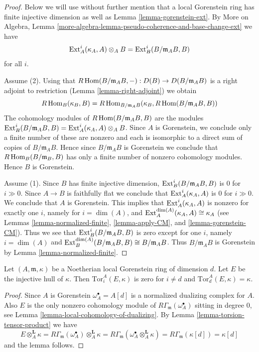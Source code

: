 \begin{proof}
Below we will use without further mention that a local Gorenstein ring
has finite injective dimension as well as Lemma \ref{lemma-gorenstein-ext}.
By More on Algebra, Lemma
\ref{more-algebra-lemma-pseudo-coherence-and-base-change-ext}
we have
$$
\mathop{\mathrm{Ext}}\nolimits^i_A(\kappa_A, A) \otimes_A B =
\mathop{\mathrm{Ext}}\nolimits^i_B(B/\mathfrak m_A B, B)
$$
for all $i$.

\medskip\noindent
Assume (2). Using that
$R\mathop{\mathrm{Hom}}\nolimits(B/\mathfrak m_A B, -) : D(B) \to D(B/\mathfrak m_A B)$ is a
right adjoint to restriction (Lemma \ref{lemma-right-adjoint}) we obtain
$$
R\mathop{\mathrm{Hom}}\nolimits_B(\kappa_B, B) =
R\mathop{\mathrm{Hom}}\nolimits_{B/\mathfrak m_A B}(\kappa_B, R\mathop{\mathrm{Hom}}\nolimits(B/\mathfrak m_A B, B))
$$
The cohomology modules of $R\mathop{\mathrm{Hom}}\nolimits(B/\mathfrak m_A B, B)$ are the modules
$\mathop{\mathrm{Ext}}\nolimits^i_B(B/\mathfrak m_A B, B) =
\mathop{\mathrm{Ext}}\nolimits^i_A(\kappa_A, A) \otimes_A B$.
Since $A$ is Gorenstein, we conclude only a finite number of these are nonzero
and each is isomorphic to a direct sum of copies of $B/\mathfrak m_A B$.
Hence since $B/\mathfrak m_A B$ is Gorenstein we conclude that
$R\mathop{\mathrm{Hom}}\nolimits_B(B/\mathfrak m_B, B)$ has only a finite number of nonzero
cohomology modules. Hence $B$ is Gorenstein.

\medskip\noindent
Assume (1). Since $B$ has finite injective dimension,
$\mathop{\mathrm{Ext}}\nolimits^i_B(B/\mathfrak m_A B, B)$ is $0$ for $i \gg 0$.
Since $A \to B$ is faithfully flat
we conclude that $\mathop{\mathrm{Ext}}\nolimits^i_A(\kappa_A, A)$ is $0$
for $i \gg 0$. We conclude that $A$ is Gorenstein. This implies that
$\mathop{\mathrm{Ext}}\nolimits^i_A(\kappa_A, A)$ is nonzero for exactly one $i$,
namely for $i = \dim(A)$, and
$\mathop{\mathrm{Ext}}\nolimits^{\dim(A)}_A(\kappa_A, A) \cong \kappa_A$
(see Lemmas \ref{lemma-normalized-finite}, \ref{lemma-apply-CM}, and
\ref{lemma-gorenstein-CM}).
Thus we see that
$\mathop{\mathrm{Ext}}\nolimits^i_B(B/\mathfrak m_A B, B)$ is zero except for one $i$,
namely $i = \dim(A)$ and
$\mathop{\mathrm{Ext}}\nolimits^{\dim(A)}_B(B/\mathfrak m_A B, B) \cong B/\mathfrak m_A B$.
Thus $B/\mathfrak m_A B$ is Gorenstein by
Lemma \ref{lemma-normalized-finite}.
\end{proof}

\begin{lemma}
\label{lemma-tor-injective-hull}
Let $(A, \mathfrak m, \kappa)$ be a Noetherian local Gorenstein ring
of dimension $d$. Let $E$ be the injective hull of $\kappa$. Then
$\text{Tor}_i^A(E, \kappa)$ is zero for $i \not = d$
and $\text{Tor}_d^A(E, \kappa) = \kappa$.
\end{lemma}

\begin{proof}
Since $A$ is Gorenstein $\omega_A^\bullet = A[d]$ is a
normalized dualizing complex for $A$.
Also $E$ is the only nonzero cohomology module of
$R\Gamma_\mathfrak m(\omega_A^\bullet)$ sitting in degree $0$, see
Lemma \ref{lemma-local-cohomology-of-dualizing}.
By Lemma \ref{lemma-torsion-tensor-product} we have
$$
E \otimes_A^\mathbf{L} \kappa =
R\Gamma_\mathfrak m(\omega_A^\bullet) \otimes_A^\mathbf{L} \kappa =
R\Gamma_\mathfrak m(\omega_A^\bullet \otimes_A^\mathbf{L} \kappa) =
R\Gamma_\mathfrak m(\kappa[d]) = \kappa[d]
$$
and the lemma follows.
\end{proof}




